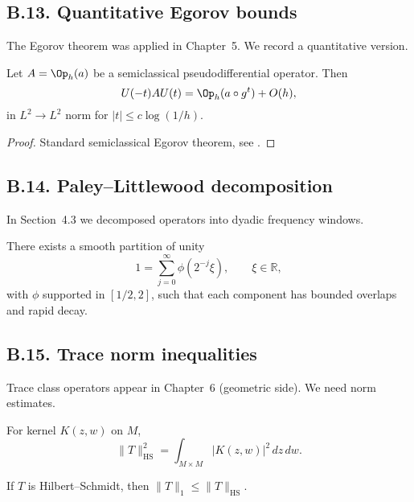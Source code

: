 \subsection*{B.13. Quantitative Egorov bounds}

\noindent
The Egorov theorem was applied in Chapter~5. We record a quantitative
version.

\begin{lemma}\label{lem:egorov}
Let $A=\Op_h(a)$ be a semiclassical pseudodifferential operator. Then
\[
U(-t) A U(t) = \Op_h(a\circ g^t) + O(h),
\]
in $L^2\to L^2$ norm for $|t|\le c\log(1/h)$.
\end{lemma}

\begin{proof}
Standard semiclassical Egorov theorem, see \cite{Zworski2012}.
\end{proof}

\subsection*{B.14. Paley–Littlewood decomposition}

\noindent
In Section~4.3 we decomposed operators into dyadic frequency windows.

\begin{lemma}\label{lem:paley-littlewood}
There exists a smooth partition of unity
\[
1 = \sum_{j=0}^\infty \phi(2^{-j}\xi),\qquad \xi\in\mathbb R,
\]
with $\phi$ supported in $[1/2,2]$, such that each component has bounded
overlaps and rapid decay.
\end{lemma}

\subsection*{B.15. Trace norm inequalities}

\noindent
Trace class operators appear in Chapter~6 (geometric side). We need norm
estimates.

\begin{lemma}\label{lem:hilbert-schmidt}
For kernel $K(z,w)$ on $M$,
\[
\|T\|_{\mathrm{HS}}^2 = \int_{M\times M} |K(z,w)|^2\,dz\,dw.
\]
\end{lemma}

\begin{corollary}\label{cor:trace}
If $T$ is Hilbert–Schmidt, then $\|T\|_1 \le \|T\|_{\mathrm{HS}}$.
\end{corollary}

